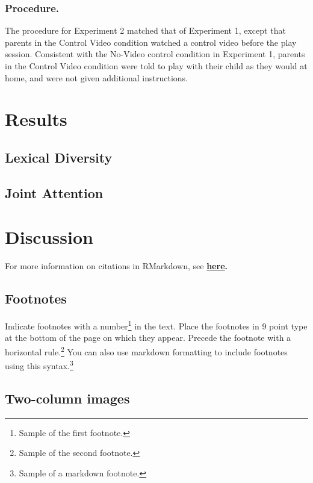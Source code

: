 \documentclass[10pt, letterpaper]{article}
\begin{document}
\subsubsection{Procedure.}\label{procedure.-1}

The procedure for Experiment 2 matched that of Experiment 1, except that
parents in the Control Video condition watched a control video before
the play session. Consistent with the No-Video control condition in
Experiment 1, parents in the Control Video condition were told to play
with their child as they would at home, and were not given additional
instructions.

\section{Results}\label{results-1}

\subsection{Lexical Diversity}\label{lexical-diversity-1}

\subsection{Joint Attention}\label{joint-attention-1}

\section{Discussion}\label{discussion}

For more information on citations in RMarkdown, see
\textbf{\href{http://rmarkdown.rstudio.com/authoring_bibliographies_and_citations.html\#citations}{here}.}

\subsection{Footnotes}\label{footnotes}

Indicate footnotes with a number\footnote{Sample of the first
footnote.} in the text. Place the footnotes in 9 point type at the
bottom of the page on which they appear. Precede the footnote with a
horizontal rule.\footnote{Sample of the second footnote.} You can also
use markdown formatting to include footnotes using this
syntax.\footnote{Sample of a markdown footnote.}

\subsection{Two-column images}\label{two-column-images}
\end{document}
